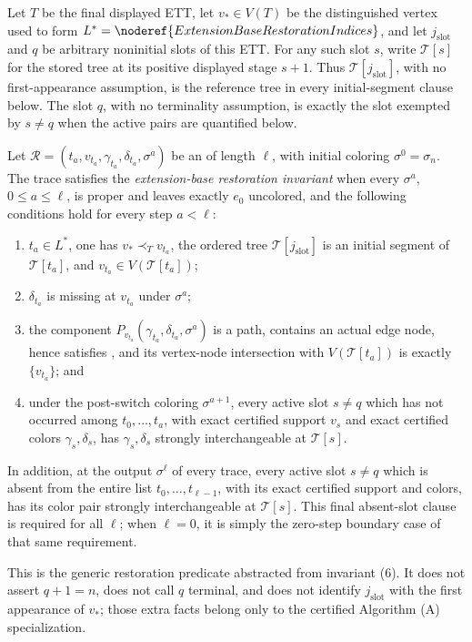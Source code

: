 \begin{definition}
Let \(T\) be the final displayed ETT, let \(v_*\in V(T)\) be the
distinguished vertex used to form
\(L^*=\noderef{ExtensionBaseRestorationIndices}\), and let
\(j_{\mathrm{slot}}\) and \(q\) be arbitrary noninitial slots of this
ETT.  For any such slot \(s\), write \(\mathcal T[s]\) for the stored
tree at its positive displayed stage \(s+1\).  Thus
\(\mathcal T[j_{\mathrm{slot}}]\), with no first-appearance assumption,
is the reference tree in every initial-segment clause below.  The slot
\(q\), with no terminality assumption, is exactly the slot exempted by
\(s\ne q\) when the active pairs are quantified below.

Let
\(\mathcal R=(t_a,v_{t_a},\gamma_{t_a},\delta_{t_a},\sigma^a)\)
be an  of length \(\ell\), with
initial coloring \(\sigma^0=\sigma_n\).  The trace satisfies the
\emph{extension-base restoration invariant} when every
\(\sigma^a\), \(0\leq a\leq\ell\), is proper and leaves exactly
\(e_0\) uncolored, and the following conditions hold for every step
\(a<\ell\):
\begin{enumerate}
\item \(t_a\in L^*\), one has \(v_*\prec_T v_{t_a}\), the ordered tree
      \(\mathcal T[j_{\mathrm{slot}}]\) is an initial segment of
      \(\mathcal T[t_a]\), and
      \(v_{t_a}\in V(\mathcal T[t_a])\);
\item \(\delta_{t_a}\) is missing at \(v_{t_a}\) under \(\sigma^a\);
\item the component
      \(P_{v_{t_a}}(\gamma_{t_a},\delta_{t_a},\sigma^a)\) is a path,
      contains an actual edge node,
      hence satisfies , and its
      vertex-node intersection with \(V(\mathcal T[t_a])\) is
      exactly \(\{v_{t_a}\}\); and
\item under the post-switch coloring \(\sigma^{a+1}\), every active
      slot \(s\ne q\) which has not occurred among
      \(t_0,\ldots,t_a\), with exact certified support \(v_s\) and
      exact certified colors \(\gamma_s,\delta_s\), has
      \(\gamma_s,\delta_s\) strongly interchangeable at
      \(\mathcal T[s]\).
\end{enumerate}
In addition, at the output \(\sigma^\ell\) of every trace, every active
slot \(s\ne q\) which is absent from the entire list
\(t_0,\ldots,t_{\ell-1}\), with its exact certified support and colors,
has its color pair strongly interchangeable at \(\mathcal T[s]\).
This final absent-slot clause is required for all \(\ell\); when
\(\ell=0\), it is simply the zero-step boundary case of that same
requirement.

This is the generic restoration predicate abstracted from invariant
(6).  It does not assert \(q+1=n\), does not call \(q\) terminal, and
does not identify \(j_{\mathrm{slot}}\) with the first appearance of
\(v_*\); those extra facts belong only to the certified Algorithm (A)
specialization.
\end{definition}
